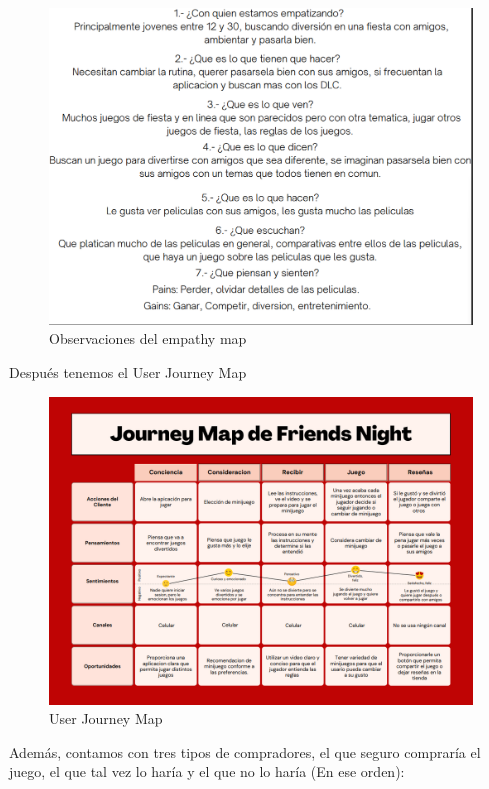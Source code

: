 \documentclass[12pt, oneside, letterpaper]{book}
\begin{document}
\begin{figure}[h]
\includegraphics[width=1.2\columnwidth]{EMexplicacionFN.png}%
\caption{Observaciones del empathy map }%
\label{EMFN}%
\end{figure}
\par Después tenemos el User Journey Map 
\begin{figure}[h]
\includegraphics[width=1.2\columnwidth]{UserJourneyMapFN.png}%
\caption{User Journey Map }%
\label{UJMFN}%
\end{figure}
\par Además, contamos con tres tipos de compradores, el que seguro compraría el juego, el que tal vez lo haría y el que no lo haría (En ese orden):
\end{document}
